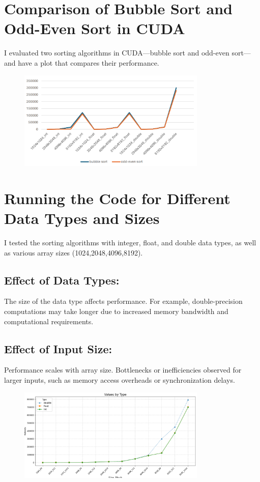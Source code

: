 \documentclass{article}
\begin{document}
\section{Comparison of Bubble Sort and Odd-Even Sort in CUDA}
I evaluated two sorting algorithms in CUDA—bubble sort and odd-even sort—and have a plot that compares their performance.


\begin{figure}[h!]
    \centering
    \includegraphics[width=0.8\textwidth]{3.png}
\end{figure}



\section{Running the Code for Different Data Types and Sizes}

I tested the sorting algorithms with integer, float, and double data types, as well as various array sizes (1024,2048,4096,8192).

\subsection{Effect of Data Types:}

The size of the data type affects performance. For example, double-precision computations may take longer due to increased memory bandwidth and computational requirements.

\subsection{Effect of Input Size:}

Performance scales with array size. Bottlenecks or inefficiencies observed for larger inputs, such as memory access overheads or synchronization delays.


\begin{figure}[h!]
    \centering
    \includegraphics[width=0.8\textwidth]{4.png}
\end{figure}
\end{document}
